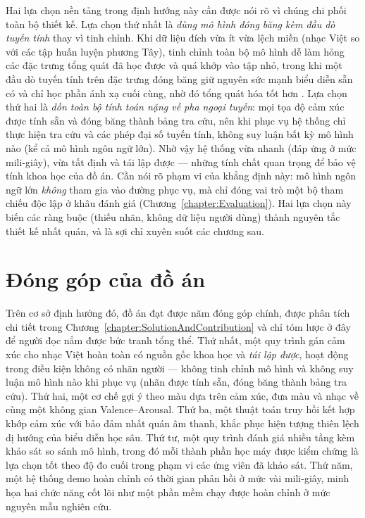 \documentclass[../DoAn.tex]{subfiles}
\begin{document}
Hai lựa chọn nền tảng trong định hướng này cần được nói rõ vì chúng chi phối toàn bộ thiết kế. Lựa chọn thứ nhất là \textit{dùng mô hình đóng băng kèm đầu dò tuyến tính} thay vì tinh chỉnh. Khi dữ liệu đích vừa ít vừa lệch miền (nhạc Việt so với các tập huấn luyện phương Tây), tinh chỉnh toàn bộ mô hình dễ làm hỏng các đặc trưng tổng quát đã học được và quá khớp vào tập nhỏ, trong khi một đầu dò tuyến tính trên đặc trưng đóng băng giữ nguyên sức mạnh biểu diễn sẵn có và chỉ học phần ánh xạ cuối cùng, nhờ đó tổng quát hóa tốt hơn \cite{kumar2022finetuning}. Lựa chọn thứ hai là \textit{dồn toàn bộ tính toán nặng về pha ngoại tuyến}: mọi tọa độ cảm xúc được tính sẵn và đóng băng thành bảng tra cứu, nên khi phục vụ hệ thống chỉ thực hiện tra cứu và các phép đại số tuyến tính, không suy luận bất kỳ mô hình nào (kể cả mô hình ngôn ngữ lớn). Nhờ vậy hệ thống vừa nhanh (đáp ứng ở mức mili-giây), vừa tất định và tái lập được --- những tính chất quan trọng để bảo vệ tính khoa học của đồ án. Cần nói rõ phạm vi của khẳng định này: mô hình ngôn ngữ lớn \textit{không} tham gia vào đường phục vụ, mà chỉ đóng vai trò một bộ tham chiếu độc lập ở khâu đánh giá (Chương~\ref{chapter:Evaluation}). Hai lựa chọn này biến các ràng buộc (thiếu nhãn, không dữ liệu người dùng) thành nguyên tắc thiết kế nhất quán, và là sợi chỉ xuyên suốt các chương sau.

\section{Đóng góp của đồ án}
\label{section:1.5}
Trên cơ sở định hướng đó, đồ án đạt được năm đóng góp chính, được phân tích chi tiết trong Chương~\ref{chapter:SolutionAndContribution} và chỉ tóm lược ở đây để người đọc nắm được bức tranh tổng thể. Thứ nhất, một quy trình gán cảm xúc cho nhạc Việt hoàn toàn có nguồn gốc khoa học và \textit{tái lập được}, hoạt động trong điều kiện không có nhãn người --- không tinh chỉnh mô hình và không suy luận mô hình nào khi phục vụ (nhãn được tính sẵn, đóng băng thành bảng tra cứu). Thứ hai, một cơ chế gợi ý theo màu dựa trên cảm xúc, đưa màu và nhạc về cùng một không gian Valence--Arousal. Thứ ba, một thuật toán truy hồi kết hợp khớp cảm xúc với bảo đảm nhất quán âm thanh, khắc phục hiện tượng thiên lệch dị hướng của biểu diễn học sâu. Thứ tư, một quy trình đánh giá nhiều tầng kèm khảo sát so sánh mô hình, trong đó mỗi thành phần học máy được kiểm chứng là lựa chọn tốt theo độ đo cuối trong phạm vi các ứng viên đã khảo sát. Thứ năm, một hệ thống demo hoàn chỉnh có thời gian phản hồi ở mức vài mili-giây, minh họa hai chức năng cốt lõi như một phần mềm chạy được hoàn chỉnh ở mức nguyên mẫu nghiên cứu.
\end{document}
